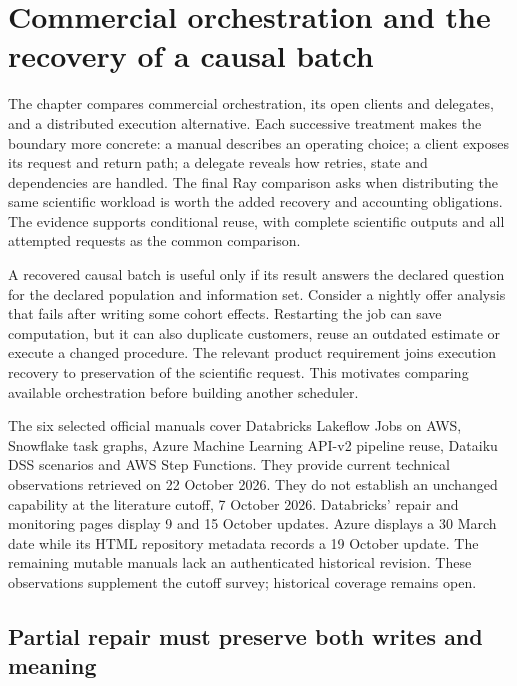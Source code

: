 \section{Commercial orchestration and the recovery of a causal batch}
\label{exec22:workflow-scope}

The chapter compares commercial orchestration, its open clients and delegates, and a distributed execution alternative. Each successive treatment makes the boundary more concrete: a manual describes an operating choice; a client exposes its request and return path; a delegate reveals how retries, state and dependencies are handled. The final Ray comparison asks when distributing the same scientific workload is worth the added recovery and accounting obligations. The evidence supports conditional reuse, with complete scientific outputs and all attempted requests as the common comparison.

A recovered causal batch is useful only if its result answers the declared
question for the declared population and information set. Consider a nightly
offer analysis that fails after writing some cohort effects. Restarting the job
can save computation, but it can also duplicate customers, reuse an outdated
estimate or execute a changed procedure. The relevant product requirement joins
execution recovery to preservation of the scientific request. This motivates
comparing available orchestration before building another scheduler.

The six selected official manuals cover Databricks Lakeflow Jobs on AWS,
Snowflake task graphs, Azure Machine Learning API-v2 pipeline reuse, Dataiku
DSS scenarios and AWS Step Functions. They provide current technical
observations retrieved on 22 October 2026. They do not establish an unchanged
capability at the literature cutoff, 7 October 2026. Databricks' repair and
monitoring pages display 9 and 15 October updates. Azure displays a 30 March
date while its HTML repository metadata records a 19 October update. The
remaining mutable manuals lack an authenticated historical revision. These
observations supplement the cutoff survey; historical coverage remains open.
\citep{exec22_workflow_databricks_repair,exec22_workflow_databricks_monitor,
exec22_workflow_azure_reuse,exec22_workflow_snowflake_graphs,
exec22_workflow_dataiku_scenarios,exec22_workflow_aws_errors}

\subsection{Partial repair must preserve both writes and meaning}


